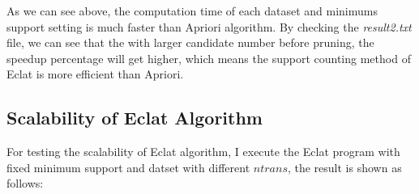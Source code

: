 \documentclass[a4paper, oneside, final, 12pt]{scrartcl} %
\begin{document}
As we can see above, the computation time of each dataset and minimums support setting
is much faster than Apriori algorithm. By checking the \emph{result2.txt} file,
we can see that the with larger candidate number before pruning,
the speedup percentage will get higher, which means the support counting method of Eclat
is more efficient than Apriori. \\

\subsection{Scalability of Eclat Algorithm}

For testing the scalability of Eclat algorithm, I execute the Eclat program with
fixed minimum support and datset with different $ntrans$, the result is shown as follows:

\newpage
\end{document}
